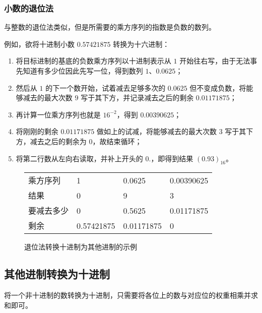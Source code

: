        \subsubsection{小数的退位法}\label{subsubsec:ArithBasics/positional-notation-conversion/from-decimal/fractal-descending-subtraction}

            与整数的退位法类似，但是所需要的乘方序列的指数是负数的数列。

            例如，欲将十进制小数 $0.57421875$ 转换为十六进制：

            \begin{enumerate}
                \item 将目标进制的基底的负数乘方序列以十进制表示从 $1$ 开始往右写，由于无法事先知道有多少位因此先写一位，得到数列 $1$、$0.0625$；
                \item 然后从 $1$ 的下一个数开始，试着减去足够多次的 $0.0625$ 但不变成负数，将能够减去的最大次数 $9$ 写于其下方，并记录减去之后的剩余 $0.01171875$；
                \item 再计算一位乘方序列也就是 $16^{-2}$，得到 $0.00390625$；
                \item 将刚刚的剩余 $0.01171875$ 做如上的试减，将能够减去的最大次数 $3$ 写于其下方，减去之后的剩余为 $0$，故结束循环；
                \item 将第二行数从左向右读取，并补上开头的 $0.$，即得到结果 $(0.93)_{16}$。
            \end{enumerate}

            \begin{figure}
                \centering
                \begin{tabular}{llll}
                    乘方序列   & 1          & 0.0625     & 0.00390625 \\
                    结果       & 0          &          9 &          3 \\ \hline
                    要减去多少 & 0          & 0.5625     & 0.01171875 \\
                    剩余       & 0.57421875 & 0.01171875 & 0
                \end{tabular}
                \caption{退位法转换十进制为其他进制的示例}
                \label{fig:ArithBasics/positional-notation-conversion/from-decimal/fractal-descending-subtraction}
            \end{figure}
    \subsection{其他进制转换为十进制}\label{subsec:ArithBasics/positional-notation-conversion/to-decimal}
        将一个非十进制的数转换为十进制，只需要将各位上的数与对应位的权重相乘并求和即可。

